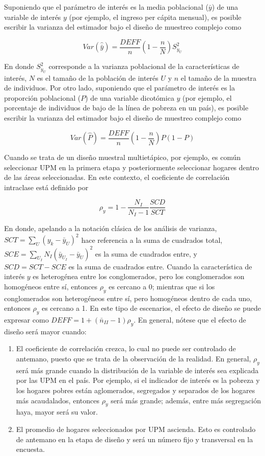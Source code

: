 \documentclass[
  12pt,
]{book}
\providecommand{\tightlist}{%
  \setlength{\itemsep}{0pt}\setlength{\parskip}{0pt}}
\begin{document}
Suponiendo que el parámetro de interés es la media poblacional (\(\bar{y}\)) de una variable de interés \(y\) (por ejemplo, el ingreso per cápita mensual), es posible escribir la varianza del estimador bajo el diseño de muestreo complejo como

\[
Var(\hat{\bar{y}}) = \frac{DEFF}{n}\left(1-\frac{n}{N}\right)S^2_{y_U}
\]

En donde \(S^2_{y_U}\) corresponde a la varianza poblacional de la características de interés, \(N\) es el tamaño de la población de interés \(U\) y \(n\) el tamaño de la muestra de individuos. Por otro lado, suponiendo que el parámetro de interés es la proporción poblacional (\(P\)) de una variable dicotómica \(y\) (por ejemplo, el porcentaje de individuos de bajo de la línea de pobreza en un país), es posible escribir la varianza del estimador bajo el diseño de muestreo complejo como

\[
Var(\hat P) = \frac{DEFF}{n}\left(1-\frac{n}{N}\right)P(1-P)
\]

Cuando se trata de un diseño muestral multietápico, por ejemplo, es común seleccionar UPM en la primera etapa y posteriormente seleccionar hogares dentro de las áreas seleccionadas. En este contexto, el coeficiente de correlación intraclase está definido por

\[
\rho_y=1-\frac{N_I}{N_I-1}\frac{SCD}{SCT}
\]

En donde, apelando a la notación clásica de los análisis de varianza, \(SCT=\sum_{U}{(y_k-{\bar{y}}_U)}^2\) hace referencia a la suma de cuadrados total, \(SCE=\sum_{U_I} N_I{({\bar{y}}_{U_I}-{\bar{y}}_U)}^2\) es la suma de cuadrados entre, y \(SCD=SCT-SCE\) es la suma de cuadrados entre. Cuando la característica de interés \(y\) es heterogénea entre los conglomerados, pero los conglomerados son homogéneos entre sí, entonces \(\rho_y\) es cercano a 0; mientras que si los conglomerados son heterogéneos entre sí, pero homogéneos dentro de cada uno, entonces \(\rho_y\) es cercano a 1. En este tipo de escenarios, el efecto de diseño se puede expresar como \(DEFF = 1 + (\bar{n}_{II}-1)\rho_y\). En general, nótese que el efecto de diseño será mayor cuando:

\begin{enumerate}
\def\labelenumi{\arabic{enumi}.}
\tightlist
\item
  El coeficiente de correlación crezca, lo cual no puede ser controlado de antemano, puesto que se trata de la observación de la realidad. En general, \(\rho_y\) será más grande cuando la distribución de la variable de interés sea explicada por las UPM en el país. Por ejemplo, si el indicador de interés es la pobreza y los hogares pobres están aglomerados, segregados y separados de los hogares más acaudalados, entonces \(\rho_y\) será más grande; además, entre más segregación haya, mayor será su valor.
\item
  El promedio de hogares seleccionados por UPM ascienda. Esto es controlado de antemano en la etapa de diseño y será un número fijo y transversal en la encuesta.
\end{enumerate}
\end{document}
